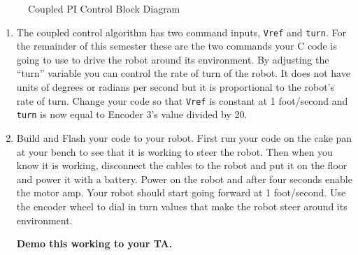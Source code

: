 \documentclass[11pt]{article}
\newcommand{\LabVDiagramFont}{\fontsize{6.9}{8.3}\selectfont}
\newcommand{\LabVDiagramFont}{\fontsize{9}{10.8}\selectfont}
\newcommand{\LabVus}{\kern0.05em\rule[-0.3ex]{0.45em}{0.5pt}\kern0.05em}
\newcommand{\LabVus}{\_}
\newcommand{\LabVplus}{\textbf{+}}
\newcommand{\LabVminus}{\rule[0.45ex]{0.6em}{0.7pt}}
\begin{document}
\begin{figure}[H]
{%
    }%
    \AltEnd
    \caption{Coupled PI Control Block Diagram}
\end{figure}
%
%
\begin{enumerate}
        \item The coupled control algorithm has two command inputs, \texttt{Vref} and \texttt{turn}. For the remainder of this semester these are the two commands your C code is going to use to drive the robot around its environment. By adjusting the “turn” variable you can control the rate of turn of the robot. It does not have units of degrees or radians per second but it is proportional to the robot’s rate of turn. Change your code so that \texttt{Vref} is constant at 1 foot/second and \texttt{turn} is now equal to Encoder 3’s value divided by 20.
    \item Build and Flash your code to your robot. First run your code on the cake pan at your bench to see that it is working to steer the robot. Then when you know it is working, disconnect the cables to the robot and put it on the floor and power it with a battery. Power on the robot and after four seconds enable the motor amp. Your robot should start going forward at 1 foot/second. Use the encoder wheel to dial in turn values that make the robot steer around its environment.
        \begin{checkoff}
                \textbf{Demo this working to your TA.}
        \end{checkoff}
\end{enumerate}
%
\end{document}
